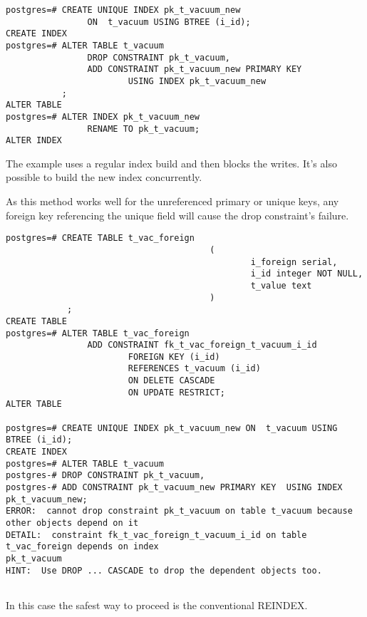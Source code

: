 \begin{lstlisting}[style=pgsql]
postgres=# CREATE UNIQUE INDEX pk_t_vacuum_new 
                ON  t_vacuum USING BTREE (i_id);
CREATE INDEX
postgres=# ALTER TABLE t_vacuum
                DROP CONSTRAINT pk_t_vacuum,
                ADD CONSTRAINT pk_t_vacuum_new PRIMARY KEY  
                        USING INDEX pk_t_vacuum_new
           ;
ALTER TABLE
postgres=# ALTER INDEX pk_t_vacuum_new 
                RENAME TO pk_t_vacuum;
ALTER INDEX

\end{lstlisting}

The example uses a regular index build and then blocks the writes. It's also possible to 
build the new index concurrently.

As this method works well for the unreferenced primary or unique keys, any foreign key 
referencing the unique field will cause the drop constraint's failure.

\begin{lstlisting}[style=pgsql]
 postgres=# CREATE TABLE t_vac_foreign
                                        (
                                                i_foreign serial,
                                                i_id integer NOT NULL,
                                                t_value text
                                        )
            ;
CREATE TABLE
postgres=# ALTER TABLE t_vac_foreign 
                ADD CONSTRAINT fk_t_vac_foreign_t_vacuum_i_id
                        FOREIGN KEY (i_id) 
                        REFERENCES t_vacuum (i_id) 
                        ON DELETE CASCADE 
                        ON UPDATE RESTRICT;
ALTER TABLE

postgres=# CREATE UNIQUE INDEX pk_t_vacuum_new ON  t_vacuum USING BTREE (i_id);
CREATE INDEX
postgres=# ALTER TABLE t_vacuum
postgres-# DROP CONSTRAINT pk_t_vacuum,
postgres-# ADD CONSTRAINT pk_t_vacuum_new PRIMARY KEY  USING INDEX pk_t_vacuum_new;
ERROR:  cannot drop constraint pk_t_vacuum on table t_vacuum because other objects depend on it
DETAIL:  constraint fk_t_vac_foreign_t_vacuum_i_id on table t_vac_foreign depends on index 
pk_t_vacuum
HINT:  Use DROP ... CASCADE to drop the dependent objects too.


\end{lstlisting}

In this case the safest way to proceed is the conventional REINDEX. 

\begin{comment}


\end{comment}


